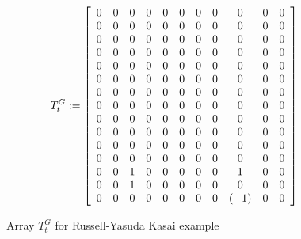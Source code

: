 \begin{figure}[ht]
\caption{Array $T^G_t$ for Russell-Yasuda Kasai example}
\label{RY:TGfig}
\[
T^G_t :=\left[
\begin{array}{ccccccccccc}
0	& 0	& 0	& 0	& 0	& 0	& 0	& 0	& 0	& 0	&0\\
0	& 0	& 0	& 0	& 0	& 0	& 0	& 0	& 0	& 0	&0\\
0	& 0	& 0	& 0	& 0	& 0	& 0	& 0	& 0	& 0	&0\\
0	& 0	& 0	& 0	& 0	& 0	& 0	& 0	& 0	& 0	&0\\
0	& 0	& 0	& 0	& 0	& 0	& 0	& 0	& 0	& 0	&0\\
0	& 0	& 0	& 0	& 0	& 0	& 0	& 0	& 0	& 0	&0\\
0	& 0	& 0	& 0	& 0	& 0	& 0	& 0	& 0	& 0	&0\\
0	& 0	& 0	& 0	& 0	& 0	& 0	& 0	& 0	& 0	&0\\
0	& 0	& 0	& 0	& 0	& 0	& 0	& 0	& 0	& 0	&0\\
0	& 0	& 0	& 0	& 0	& 0	& 0	& 0	& 0	& 0	&0\\
0	& 0	& 0	& 0	& 0	& 0	& 0	& 0	& 0	& 0	&0\\
0	& 0	& 0	& 0	& 0	& 0	& 0	& 0	& 0	& 0	&0\\
0	& 0	& 1	& 0	& 0	& 0	& 0	& 0	& 1	& 0	&0\\
0	& 0	& 1	& 0	& 0	& 0	& 0	& 0	& 0	& 0	&0\\
0	& 0	& 0	& 0	& 0	& 0	& 0	& 0	& (-1)	& 0	&0\\

\end{array}
\right]
\]
\end{figure}%
